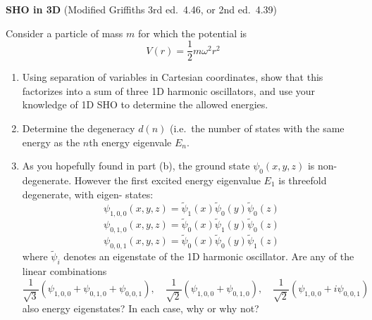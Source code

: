 \documentclass{article}
\begin{document}
\begin{ques}\label{q3}
\textbf{SHO in 3D} (Modified Griffiths 3rd ed.\ 4.46, or 2nd ed.\ 4.39)

Consider a particle of mass $m$ for which the potential is
\[
V(r) = \frac{1}{2} m\omega^2 r^2
\]

\begin{enumerate}
\item[(a)] Using separation of variables in Cartesian coordinates, show that this factorizes into
a sum of three 1D harmonic oscillators, and use your knowledge of 1D SHO to
determine the allowed energies.
\item[(b)] Determine the degeneracy $d(n)$ (i.e.\ the number of states with the same energy as
the $n$th energy eigenvale $E_n$.
\item[(c)] As you hopefully found in part (b), the ground state $\psi_0(x,y,z)$ is non-degenerate.
However the first excited energy eigenvalue $E_1$ is threefold degenerate, with eigen-
states:
\[
\psi_{1,0,0}(x,y,z) = \tilde{\psi}_1(x)\tilde{\psi}_0(y)\tilde{\psi}_0(z)
\]
\[
\psi_{0,1,0}(x,y,z) = \tilde{\psi}_0(x)\tilde{\psi}_1(y)\tilde{\psi}_0(z)
\]
\[
\psi_{0,0,1}(x,y,z) = \tilde{\psi}_0(x)\tilde{\psi}_0(y)\tilde{\psi}_1(z)
\]
where $\tilde{\psi}_i$ denotes an eigenstate of the 1D harmonic oscillator. Are any of the linear
combinations
\[
\frac{1}{\sqrt{3}}(\psi_{1,0,0} + \psi_{0,1,0} + \psi_{0,0,1}),
\quad
\frac{1}{\sqrt{2}}(\psi_{1,0,0} + \psi_{0,1,0}),
\quad
\frac{1}{\sqrt{2}}(\psi_{1,0,0} + i\psi_{0,0,1})
\]
also energy eigenstates? In each case, why or why not?
\end{enumerate}
\end{ques}
\end{document}
